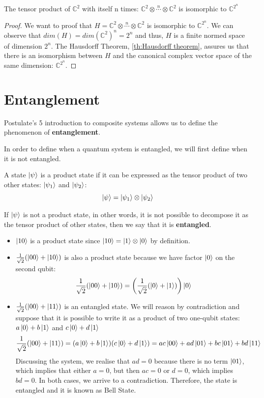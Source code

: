 \begin{corolario}
    The tensor product of $\mathbb{C}^2$ with itself n times: $\mathbb{C}^2\otimes \stackrel{n}{\cdots} \otimes \mathbb{C}^2$ is isomorphic to $\mathbb{C}^{2^n}$
\end{corolario}
\begin{proof}
    We want to proof that $H=\mathbb{C}^2\otimes \stackrel{n}{\cdots} \otimes \mathbb{C}^2$ is isomorphic to $\mathbb{C}^{2^n}$. We can observe that $dim(H)=dim(\mathbb{C}^2)^n =  2^n$ and thus, $H$ is a finite normed space of dimension $2^n$. The Hausdorff Theorem, \autoref{th:Hausdorff theorem}, assures us that there is an isomorphism between $H$ and the canonical complex vector space of the same dimension: $\mathbb{C}^{2^n}$. 
\end{proof}

\section{Entanglement}\label{sec:entanglement}
Postulate's 5 introduction to composite systems allows us to define the phenomenon of \textbf{entanglement}.

In order to define when a quantum system is entangled, we will first define when it is not entangled.

A state $\ket{\psi}$ is a product state if it can be expressed as the tensor product of two other states: $\ket{\psi_1}$ and $\ket{\psi_2}$:
$$\ket{\psi} = \ket{\psi_1} \otimes \ket{\psi_2}$$

If $\ket{\psi}$ is not a product state, in other words, it is not possible to decompose it as the tensor product of other states, then we say that it is \textbf{entangled}.

\begin{ejemplo}

    \begin{itemize}
    
        \item $\ket{10}$ is a product state since $\ket{10} = \ket{1} \otimes \ket{0}$ by definition.

        \item $\frac{1}{\sqrt{2}}(\ket{00} + \ket{10})$ is also a product state because we have factor $\ket{0}$ on the second qubit:
        $$\frac{1}{\sqrt{2}}(\ket{00}+\ket{10}) = \left(\frac{1}{\sqrt{2}}(\ket{0}+\ket{1})\right)\ket{0} $$

        \item $\frac{1}{\sqrt{2}}(\ket{00}+\ket{11})$ is an entangled state. We will reason by contradiction and suppose that it is possible to write it as a product of two one-qubit states: $a \ket{0}+ b\ket{1}$ and $c\ket{0} + d \ket{1}$
        $$\frac{1}{\sqrt{2}}(\ket{00} + \ket{11}) = (a\ket{0}+b\ket{1})(c \ket{0}+d \ket{1}) = ac \ket{00} + ad \ket{01} + bc\ket{01} + bd\ket{11}$$
        Discussing the system, we realise that $ad = 0$ because there is no term $\ket{01}$, which implies that either $a=0$, but then $ac=0$ or $d=0$, which implies $bd=0$. In both cases, we arrive to a contradiction. Therefore, the state is entangled and it is known as Bell State. 
    \end{itemize}
\end{ejemplo}

